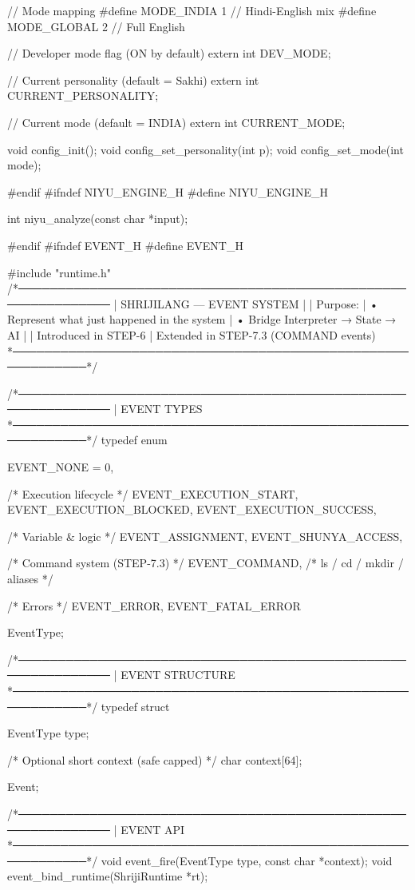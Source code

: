 \documentclass{article}
\begin{document}
// Mode mapping
#define MODE_INDIA  1   // Hindi-English mix
#define MODE_GLOBAL 2   // Full English

// Developer mode flag (ON by default)
extern int DEV_MODE;

// Current personality (default = Sakhi)
extern int CURRENT_PERSONALITY;

// Current mode (default = INDIA)
extern int CURRENT_MODE;

void config_init();
void config_set_personality(int p);
void config_set_mode(int mode);

#endif
#ifndef NIYU_ENGINE_H
#define NIYU_ENGINE_H

int niyu_analyze(const char *input);

#endif
#ifndef EVENT_H
#define EVENT_H

#include "runtime.h"
/*──────────────────────────────────────────────────────────────
 |  SHRIJILANG — EVENT SYSTEM
 |
 |  Purpose:
 |   • Represent what just happened in the system
 |   • Bridge Interpreter → State → AI
 |
 |  Introduced in STEP-6
 |  Extended in STEP-7.3 (COMMAND events)
 *────────────────────────────────────────────────────────────*/

/*──────────────────────────────────────────────────────────────
 |  EVENT TYPES
 *────────────────────────────────────────────────────────────*/
typedef enum {

    EVENT_NONE = 0,

    /* Execution lifecycle */
    EVENT_EXECUTION_START,
    EVENT_EXECUTION_BLOCKED,
    EVENT_EXECUTION_SUCCESS,

    /* Variable & logic */
    EVENT_ASSIGNMENT,
    EVENT_SHUNYA_ACCESS,

    /* Command system (STEP-7.3) */
    EVENT_COMMAND,          /* ls / cd / mkdir / aliases */

    /* Errors */
    EVENT_ERROR,
    EVENT_FATAL_ERROR

} EventType;


/*──────────────────────────────────────────────────────────────
 |  EVENT STRUCTURE
 *────────────────────────────────────────────────────────────*/
typedef struct {

    EventType type;

    /* Optional short context (safe capped) */
    char context[64];

} Event;


/*──────────────────────────────────────────────────────────────
 |  EVENT API
 *────────────────────────────────────────────────────────────*/
void event_fire(EventType type, const char *context);
void event_bind_runtime(ShrijiRuntime *rt);
\end{document}
